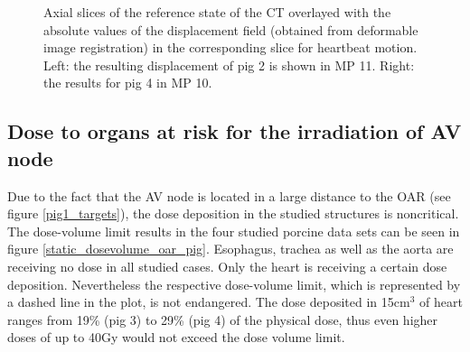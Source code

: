 \documentclass[type=dr, dr=rernat, accentcolor=tud7b,colorbacktitle, bigchapter, openright, twoside, 12pt ]{tudthesis}
\begin{document}
\begin{figure}[H]
{}
\caption{Axial slices of the reference state of the CT overlayed with the absolute values of the displacement field (obtained from 
deformable image registration) in the corresponding slice for heartbeat motion. Left: the resulting displacement of pig 2 is shown 
in MP 11. Right: the results for pig 4 in MP 10.}
\label{contour_plot_hb_pigs}
\end{figure}
 
\newpage






\newpage

\subsection{Dose to organs at risk for the irradiation of AV node}

Due to the fact that the AV node is located in a large distance to the OAR (see figure \ref{pig1_targets}), the dose 
deposition in the studied structures is noncritical. The dose-volume limit results in the four studied porcine data sets can be seen 
in figure \ref{static_dosevolume_oar_pig}. Esophagus, trachea as well as the aorta are receiving no dose in all studied cases. 
Only the heart is receiving a certain dose deposition. Nevertheless the respective dose-volume limit, which is represented by a dashed line 
in the plot, is not endangered. The dose deposited in 15cm$^{3}$ of heart ranges from 19\% (pig 3) to 29\% (pig 4) of the physical dose, thus 
even higher doses of up to 40Gy would not exceed the dose volume limit. 
\end{document}
